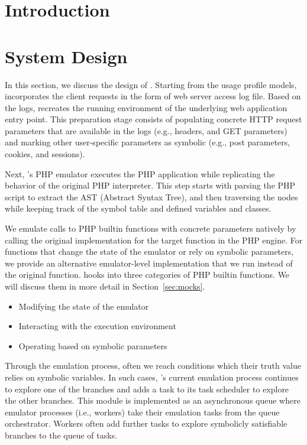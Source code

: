 \section{Introduction}

\section{System Design}
In this section, we discuss the design of \sys{}. 
Starting from the usage profile models, \sys{} incorporates the client requests in the form of web server access log file. 
Based on the logs, \sys{} recreates the running environment of the underlying web application entry point. 
This preparation stage consists of populating concrete HTTP request parameters that are available in the logs (e.g., headers, and GET parameters) and marking other user-specific parameters as symbolic (e.g., post parameters, cookies, and sessions). 

Next, \sys{}'s PHP emulator executes the PHP application while replicating the behavior of the original PHP interpreter. 
This step starts with parsing the PHP script to extract the AST (Abstract Syntax Tree), and then traversing the nodes while keeping track of the symbol table and defined variables and classes. 

We emulate calls to PHP builtin functions with concrete parameters natively by calling the original implementation for the target function in the PHP engine. 
For functions that change the state of the emulator or rely on symbolic parameters, we provide an alternative emulator-level implementation that we run instead of the original function. 
\sys{} hooks into three categories of PHP builtin functions. 
We will discuss them in more detail in Section~\ref{sec:mocks}.
\begin{itemize}
    \item Modifying the state of the emulator
    \item Interacting with the execution environment
    \item Operating based on symbolic parameters
\end{itemize}

Through the emulation process, often we reach conditions which their truth value relies on symbolic variables. 
In such cases, \sys{}'s current emulation process continues to explore one of the branches and adds a task to its task scheduler to explore the other branches. 
This module is implemented as an asynchronous queue where emulator processes (i.e., workers) take their emulation tasks from the queue orchestrator. 
Workers often add further tasks to explore symbolicly satisfiable branches to the queue of tasks. 

